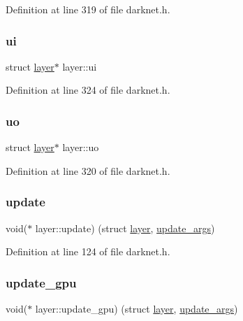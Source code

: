 Definition at line 319 of file darknet.\+h.

\mbox{\label{structlayer_ab1c06528fcb7f3a3ffedfc89db86d109}} 
\subsubsection{\texorpdfstring{ui}{ui}}
{\footnotesize\ttfamily struct \mbox{\hyperlink{structlayer}{layer}}$\ast$ layer\+::ui}



Definition at line 324 of file darknet.\+h.

\mbox{\label{structlayer_a071f72e7d57e6612d98defa8d4f1e3e7}} 
\subsubsection{\texorpdfstring{uo}{uo}}
{\footnotesize\ttfamily struct \mbox{\hyperlink{structlayer}{layer}}$\ast$ layer\+::uo}



Definition at line 320 of file darknet.\+h.

\mbox{\label{structlayer_aefdbd48c48e52160fd806da7973de6e8}} 
\subsubsection{\texorpdfstring{update}{update}}
{\footnotesize\ttfamily void($\ast$ layer\+::update) (struct \mbox{\hyperlink{structlayer}{layer}}, \mbox{\hyperlink{structupdate__args}{update\+\_\+args}})}



Definition at line 124 of file darknet.\+h.

\mbox{\label{structlayer_a820d8c7a9764dae29abe87e12f89b19e}} 
\subsubsection{\texorpdfstring{update\_gpu}{update\_gpu}}
{\footnotesize\ttfamily void($\ast$ layer\+::update\+\_\+gpu) (struct \mbox{\hyperlink{structlayer}{layer}}, \mbox{\hyperlink{structupdate__args}{update\+\_\+args}})}




